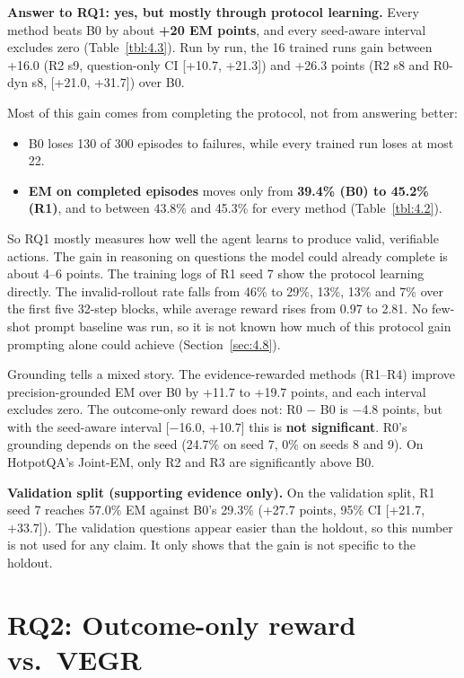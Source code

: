 \textbf{Answer to RQ1: yes, but mostly through protocol learning.} Every
method beats B0 by about \textbf{+20 EM points}, and every seed-aware
interval excludes zero (Table~\ref{tbl:4.3}). Run by run, the 16 trained
runs gain between +16.0 (R2 s9, question-only CI {[}+10.7, +21.3{]}) and
+26.3 points (R2 s8 and R0-dyn s8, {[}+21.0, +31.7{]}) over B0.

Most of this gain comes from completing the protocol, not from answering
better:

\begin{itemize}
\tightlist
\item
  B0 loses 130 of 300 episodes to failures, while every trained run
  loses at most 22.
\item
  \textbf{EM on completed episodes} moves only from \textbf{39.4\% (B0)
  to 45.2\% (R1)}, and to between 43.8\% and 45.3\% for every method
  (Table~\ref{tbl:4.2}).
\end{itemize}

So RQ1 mostly measures how well the agent learns to produce valid,
verifiable actions. The gain in reasoning on questions the model could
already complete is about 4--6 points. The training logs of R1 seed 7
show the protocol learning directly. The invalid-rollout rate falls from
46\% to 29\%, 13\%, 13\% and 7\% over the first five 32-step blocks,
while average reward rises from 0.97 to 2.81. No few-shot prompt
baseline was run, so it is not known how much of this protocol gain
prompting alone could achieve (Section~\ref{sec:4.8}).

Grounding tells a mixed story. The evidence-rewarded methods (R1--R4)
improve precision-grounded EM over B0 by +11.7 to +19.7 points, and each
interval excludes zero. The outcome-only reward does not: R0 − B0 is
−4.8 points, but with the seed-aware interval {[}−16.0, +10.7{]} this is
\textbf{not significant}. R0's grounding depends on the seed (24.7\% on
seed 7, 0\% on seeds 8 and 9). On HotpotQA's Joint-EM, only R2 and R3
are significantly above B0.

\textbf{Validation split (supporting evidence only).} On the validation
split, R1 seed 7 reaches 57.0\% EM against B0's 29.3\% (+27.7 points,
95\% CI {[}+21.7, +33.7{]}). The validation questions appear easier than
the holdout, so this number is not used for any claim. It only shows
that the gain is not specific to the holdout.

\section{RQ2: Outcome-only reward vs.~VEGR}\label{sec:4.4}

